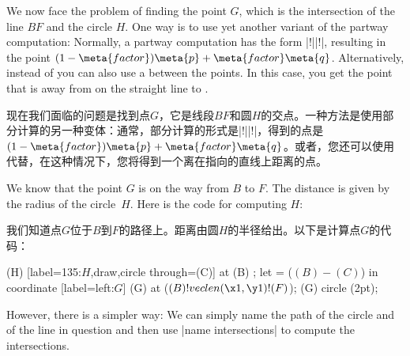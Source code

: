 \begin{paracol}{2}
We now face the problem of finding the point $G$, which is the intersection of
the line $BF$ and the circle $H$. One way is to use yet another variant of the
partway computation: Normally, a partway computation has the form
|!||!|, resulting in the point
$(1-\meta{factor})\meta{p} + \meta{factor}\meta{q}$. Alternatively, instead of
 you can also use a  between the points. In this
case, you get the point that is  away from  on the
straight line to .

现在我们面临的问题是找到点$G$，它是线段$BF$和圆$H$的交点。一种方法是使用部分计算的另一种变体：通常，部分计算的形式是|!||!|，得到的点是$(1-\meta{factor})\meta{p} + \meta{factor}\meta{q}$。或者，您还可以使用代替，在这种情况下，您将得到一个离在指向的直线上距离的点。

We know that the point $G$ is on the way from $B$ to $F$. The distance is given
by the radius of the circle~$H$. Here is the code for computing $H$:

我们知道点$G$位于$B$到$F$的路径上。距离由圆$H$的半径给出。以下是计算点$G$的代码：
%
{\ifpgfmanualexternalize\tikzexternaldisable\fi
\begin{codeexample}[
    preamble={\usetikzlibrary{calc,through}},
    pre={\begin{tikzpicture}
  \coordinate [label=left:$A$]  (A) at (0,0);
  \coordinate [label=right:$B$] (B) at (0.75,0.25);
  \coordinate [label=above:$C$] (C) at (1,1.5);
  \draw (A) -- (B) -- (C);
  \coordinate [label=above:$D$] (D) at
    ($ (A) ! .5 ! (B) ! {sin(60)*2} ! 90:(B) $) {};
  \draw (D) -- ($ (D) ! 3.5 ! (B) $) coordinate [label=below:$F$] (F);
  \draw (D) -- ($ (D) ! 2.5 ! (A) $) coordinate [label=below:$E$] (E);},
    post={\end{tikzpicture}},
]
  \node (H) [label=135:$H$,draw,circle through=(C)] at (B) {};
  \path let  = ($ (B) - (C) $) in
    coordinate [label=left:$G$] (G) at ($ (B) ! veclen(\x1,\y1) ! (F) $);
  \fill[red,opacity=.5] (G) circle (2pt);
\end{codeexample}

However, there is a simpler way: We can simply name the path of the circle and
of the line in question and then use |name intersections| to compute the
intersections.

}
\end{paracol}
